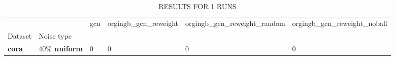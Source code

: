 \begin{table}
\caption{RESULTS FOR 1 RUNS}
\begin{tabular}{llllll}
\toprule
 &  & gcn & orgingb_gcn_reweight & orgingb_gcn_reweight_random & orgingb_gcn_reweight_noball \\
Dataset & Noise type &  &  &  &  \\
\midrule
\textbf{cora} & \textbf{$ 40 \% $ uniform} & 0 & 0 & 0 & 0 \\
\cline{1-6}
\bottomrule
\end{tabular}
\end{table}

